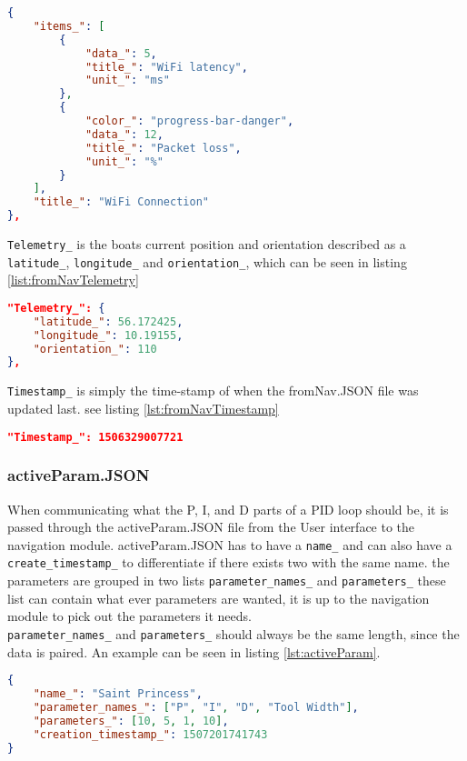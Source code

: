 \begin{lstlisting}[caption = {Example of an object in Status_ in fromNav.JSON}, captionpos=b, label={lst:fromNavStatusItem}, language=json,firstnumber=1]
{
    "items_": [
        {
            "data_": 5,
            "title_": "WiFi latency",
            "unit_": "ms"
        },
        {
            "color_": "progress-bar-danger",
            "data_": 12,
            "title_": "Packet loss",
            "unit_": "%"
        }
    ],
    "title_": "WiFi Connection"
},
\end{lstlisting}

\texttt{Telemetry_} is the boats current position and orientation described as a \texttt{latitude_}, \texttt{longitude_} and \texttt{orientation_}, which can be seen in listing \ref{list:fromNavTelemetry}

\begin{lstlisting}[caption = {Example of an Telemetry_ object in fromNav.JSON}, captionpos=b, label={lst:fromNavTelemetry}, language=json,firstnumber=1]
"Telemetry_": {
    "latitude_": 56.172425,
    "longitude_": 10.19155,
    "orientation_": 110
},
\end{lstlisting}

\texttt{Timestamp_} is simply the time-stamp of when the fromNav.JSON file was updated last. see listing \ref{lst:fromNavTimestamp} 

\begin{lstlisting}[caption = {Example of an Timestamp_ object in fromNav.JSON}, captionpos=b, label={lst:fromNavTimestamp}, language=json,firstnumber=1]
"Timestamp_": 1506329007721
\end{lstlisting}


\subsubsection{activeParam.JSON}
When communicating what the P, I, and D parts of a PID loop should be, it is passed through the activeParam.JSON file from the User interface to the navigation module. activeParam.JSON has to have a \texttt{name_} and can also have a \texttt{create_timestamp_} to differentiate if there exists two with the same name. the parameters are grouped in two lists \texttt{parameter_names_} and \texttt{parameters_} these list can contain what ever parameters are wanted, it is up to the navigation module to pick out the parameters it needs.\\
\texttt{parameter_names_} and \texttt{parameters_} should always be the same length, since the data is paired.
An example can be seen in listing \ref{lst:activeParam}.
\begin{lstlisting}[caption = {Example of activeParam.JSON}, captionpos=b, label={lst:activeParam}, language=json,firstnumber=1]
{
	"name_": "Saint Princess",
	"parameter_names_": ["P", "I", "D", "Tool Width"],
	"parameters_": [10, 5, 1, 10],
	"creation_timestamp_": 1507201741743
}
\end{lstlisting}
